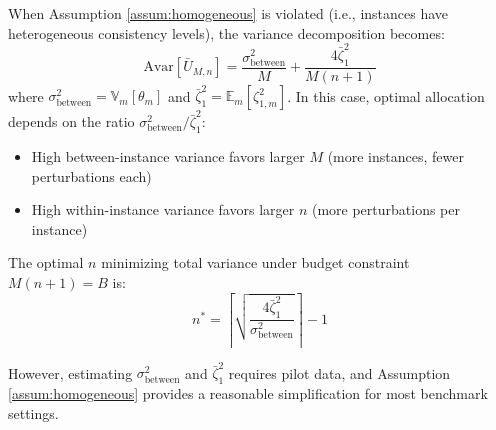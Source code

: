 \documentclass{article}
\theoremstyle{plain}
\theoremstyle{definition}
\theoremstyle{remark}
\begin{document}
When Assumption \ref{assum:homogeneous} is violated (i.e., instances have heterogeneous consistency levels), the variance decomposition becomes:
\begin{equation}
    \text{Avar}[\bar{U}_{M,n}] = \frac{\sigma_{\text{between}}^2}{M} + \frac{4\bar{\zeta}_1^2}{M(n+1)}
\end{equation}
where $\sigma_{\text{between}}^2 = \mathbb V_m[\theta_m]$ and $\bar{\zeta}_1^2 = \mathbb E_m[\zeta_{1,m}^2]$. In this case, optimal allocation depends on the ratio $\sigma_{\text{between}}^2 / \bar{\zeta}_1^2$:
\begin{itemize}[nolistsep,leftmargin=*]
    \item High between-instance variance favors larger $M$ (more instances, fewer perturbations each)
    \item High within-instance variance favors larger $n$ (more perturbations per instance)
\end{itemize}

The optimal $n$ minimizing total variance under budget constraint $M(n+1) = B$ is:
\begin{equation}
    n^* = \left\lceil \sqrt{\frac{4\bar{\zeta}_1^2}{\sigma_{\text{between}}^2}} \right\rceil - 1
\end{equation}

However, estimating $\sigma_{\text{between}}^2$ and $\bar{\zeta}_1^2$ requires pilot data, and Assumption \ref{assum:homogeneous} provides a reasonable simplification for most benchmark settings.
\end{document}
